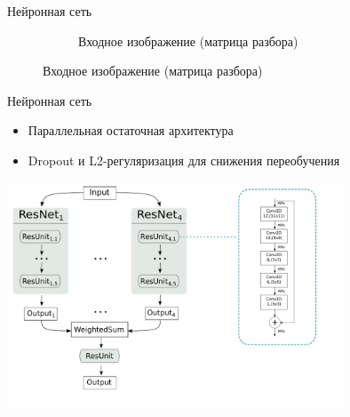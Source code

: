 \documentclass{beamer}
\begin{document}
\begin{frame}{Нейронная сеть}
\begin{figure}[h]
\begin{subfigure}{.33\textwidth}
\begin{overprint}
          \end{overprint}
          \caption{Входное изображение (матрица разбора)}
    \end{subfigure}%
\end{figure}
\end{frame}

\begin{frame}{Нейронная сеть}
\begin{itemize}
    \item Параллельная остаточная архитектура
    \item Dropout и L2-регуляризация для снижения переобучения
\end{itemize}

\vspace{3mm}

\centering
\includegraphics[width=10cm]{pics/nn.pdf}
\end{frame}
\end{document}
